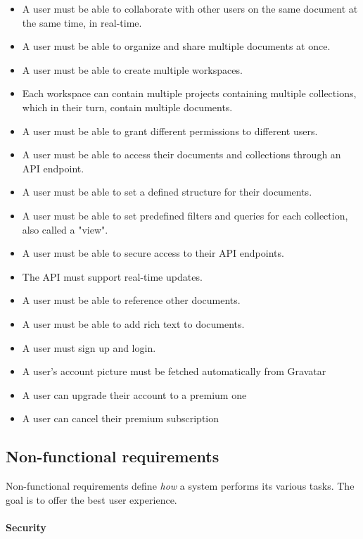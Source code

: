 \begin{itemize}
	\item A user must be able to collaborate with other users on the same document at the same time, in real-time.
	\item A user must be able to organize and share multiple documents at once.
	\item A user must be able to create multiple workspaces.
	\item Each workspace can contain multiple projects containing multiple collections, which in their turn, contain multiple documents.
	\item A user must be able to grant different permissions to different users.
	\item A user must be able to access their documents and collections through an API endpoint.
	\item A user must be able to set a defined structure for their documents.
	\item A user must be able to set predefined filters and queries for each collection, also called a "view".
	\item A user must be able to secure access to their API endpoints.
	\item The API must support real-time updates.
	\item A user must be able to reference other documents.
	\item A user must be able to add rich text to documents.
	\item
	      A user must sign up and login.
	\item
	      A user's account picture must be fetched automatically from Gravatar
	\item
	      A user can upgrade their account to a premium one
	\item
	      A user can cancel their premium subscription
\end{itemize}

\subsection{Non-functional requirements}

Non-functional requirements define \textit{how} a system performs its various tasks. The goal is to offer the best user experience.

\paragraph{Security}

